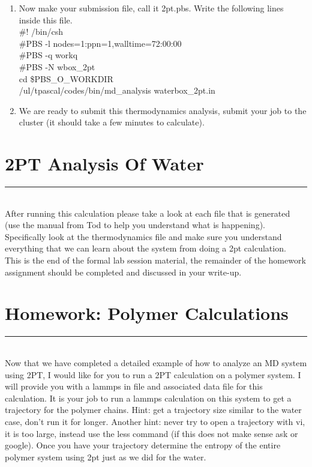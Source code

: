 \documentclass{article}
\begin{document}
\begin{enumerate}
\item Now make your submission file, call it 2pt.pbs.
Write the following lines inside this file.\\
\#! /bin/csh\\
\#PBS -l nodes=1:ppn=1,walltime=72:00:00\\
\#PBS -q workq\\
\#PBS -N wbox\_2pt\\
cd \$PBS\_O\_WORKDIR\\
/ul/tpascal/codes/bin/md\_analysis waterbox\_2pt.in\\

\item We are ready to submit this thermodynamics analysis, submit your job to the cluster (it should take a few minutes to calculate).
\end{enumerate}

\section{2PT Analysis Of Water}
\noindent\rule[0.5ex]{\linewidth}{1pt}\\

After running this calculation please take a look at each file that is generated (use the manual from Tod to help you understand what is happening). 
Specifically look at the thermodynamics file and make sure you understand everything that we can learn about the system from doing a 2pt calculation.\\

This is the end of the formal lab session material, the remainder of the homework assignment should be completed and discussed in your write-up.

\section{Homework: Polymer Calculations}
\noindent\rule[0.5ex]{\linewidth}{1pt}\\

Now that we have completed a detailed example of how to analyze an MD system using 2PT, I would like for you to run a 2PT calculation on a polymer system. 
I will provide you with a lammps in file and associated data file for this calculation.
It is your job to run a lammps calculation on this system to get a trajectory for the polymer chains.
Hint: get a trajectory size similar to the water case, don't run it for longer. 
Another hint: never try to open a trajectory with vi, it is too large, instead use the less command (if this does not make sense ask or google). 
Once you have your trajectory determine the entropy of the entire polymer system using 2pt just as we did for the water. \\
\end{document}
